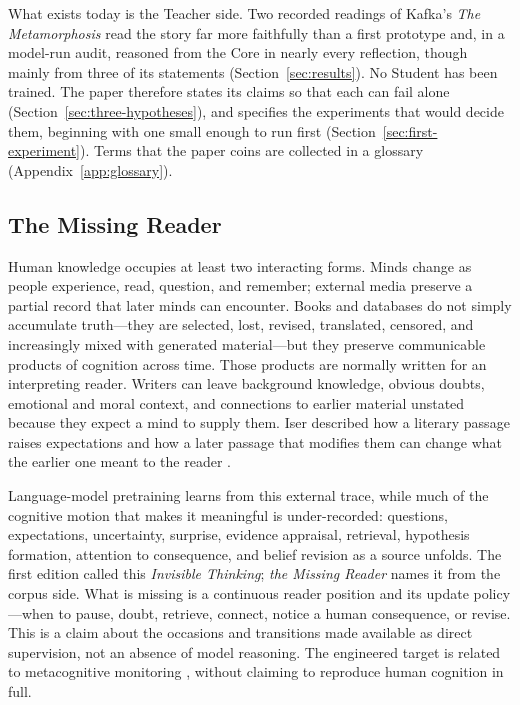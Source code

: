 \documentclass[11pt]{article}
\begin{document}
What exists today is the Teacher side. Two recorded readings of Kafka's
\emph{The Metamorphosis} read the story far more faithfully than a first
prototype and, in a model-run audit, reasoned from the Core in nearly every
reflection, though mainly from three of its statements
(Section~\ref{sec:results}). No Student has been trained. The paper
therefore states its claims so that each can fail alone
(Section~\ref{sec:three-hypotheses}), and specifies the experiments that would
decide them, beginning with one small enough to run first
(Section~\ref{sec:first-experiment}). Terms that the paper coins are collected
in a glossary (Appendix~\ref{app:glossary}).

\subsection{The Missing Reader}\label{sec:invisible-thinking}

Human knowledge occupies at least two interacting forms. Minds change as people
experience, read, question, and remember; external media preserve a partial
record that later minds can encounter. Books and databases do not simply
accumulate truth---they are selected, lost, revised, translated, censored, and
increasingly mixed with generated material---but they preserve communicable
products of cognition across time. Those products are normally written for an
interpreting reader. Writers can leave background knowledge, obvious doubts,
emotional and moral context, and connections to earlier material unstated
because they expect a mind to supply them. Iser described how a literary
passage raises expectations and how a later passage that modifies them can
change what the earlier one meant to the reader \cite{iser1972reading}.

Language-model pretraining learns from this external trace, while much of
the cognitive motion that makes it meaningful is under-recorded: questions,
expectations, uncertainty, surprise, evidence appraisal, retrieval, hypothesis
formation, attention to consequence, and belief revision as a source unfolds.
The first edition called this \emph{Invisible Thinking}; \emph{the Missing
Reader} names it from the corpus side. What is missing is
a continuous reader position and its update policy---when to pause, doubt,
retrieve, connect, notice a human consequence, or revise. This is a claim about
the occasions and transitions made available as direct supervision, not an
absence of model reasoning. The engineered target is related to metacognitive
monitoring \cite{flavell1979metacognition}, without claiming to reproduce human
cognition in full.
\end{document}
